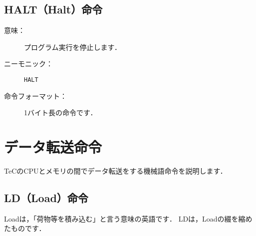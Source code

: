 \subsection{HALT（Halt）命令}
\begin{description}
\item[意味：]プログラム実行を停止します．

\item[ニーモニック：]{\tt HALT}

\item[命令フォーマット：]1バイト長の命令です．


\end{description}

\newpage
\section{データ転送命令}
TeCのCPUとメモリの間でデータ転送をする機械語命令を説明します．

\subsection{LD（Load）命令}
Loadは，「荷物等を積み込む」と言う意味の英語です．
LDは，Loadの綴を縮めたものです．

